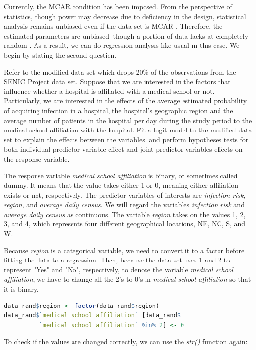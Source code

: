 \documentclass[11pt]{article}
\begin{document}
Currently, the MCAR condition has been imposed. From the perspective of statistics, though power may decrease due to deficiency in the design, statistical analysis remains unbiased even if the data set is MCAR \cite{ar:kang}. Therefore, the estimated parameters are unbiased, though a portion of data lacks at completely random \cite{ar:kang}. As a result, we can do regression analysis like usual in this case. We begin by stating the second question.

\begin{question}
Refer to the modified data set which drops 20\% of the observations from the SENIC Project data set. Suppose that we are interested in the factors that influence whether a hospital is affiliated with a medical school or not. Particularly, we are interested in the effects of the average estimated probability of acquiring infection in a hospital, the hospital's geographic region and the average number of patients in the hospital per day during the study period to the medical school affiliation with the hospital. Fit a logit model to the modified data set to explain the effects between the variables, and perform hypotheses tests for both individual predictor variable effect and joint predictor variables effects on the response variable.
\end{question}

The response variable \textit{medical school affiliation} is binary, or sometimes called dummy. It means that the value takes either 1 or 0, meaning either affiliation exists or not, respectively. The predictor variables of interests are \textit{infection risk}, \textit{region}, and \textit{average daily census}. We will regard the variables \textit{infection risk} and \textit{average daily census} as continuous. The variable \textit{region} takes on the values 1, 2, 3, and 4, which represents four different geographical locations, NE, NC, S, and W.

Because \textit{region} is a categorical variable, we need to convert it to a factor before fitting the data to a regression. Then, because the data set uses 1 and 2 to represent "Yes" and "No", respectively, to denote the variable \textit{medical school affiliation}, we have to change all the 2's to 0's in \textit{medical school affiliation} so that it is binary.

\begin{file}[hospital.r]
\begin{lstlisting}[language = R]
data_rand$region <- factor(data_rand$region)
data_rand$`medical school affiliation` [data_rand$
          `medical school affiliation` %in% 2] <- 0
\end{lstlisting}
\end{file}
To check if the values are changed correctly, we can use the \textit{str()} function again:
\end{document}
